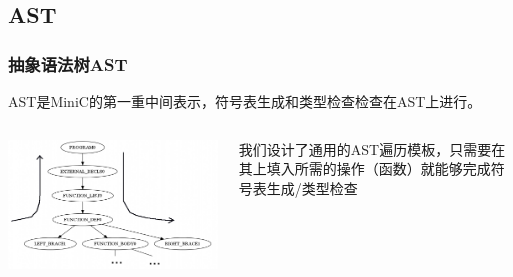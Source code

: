 \documentclass{beamer}
\begin{document}
\subsection{AST}
\begin{frame}
\frametitle{抽象语法树AST}
\noindent
AST是MiniC的第一重中间表示，符号表生成和类型检查检查在AST上进行。
\begin{columns}
	\begin{flushleft}
	\phantom{x}
	\vspace{0.2cm}
	\includegraphics[scale=0.4]{AST_travel.png}
	\end{flushleft}
	\small{我们设计了通用的AST遍历模板，只需要在其上填入所需的操作（函数）就能够完成符号表生成/类型检查}
\end{columns}
\end{frame}
\end{document}
